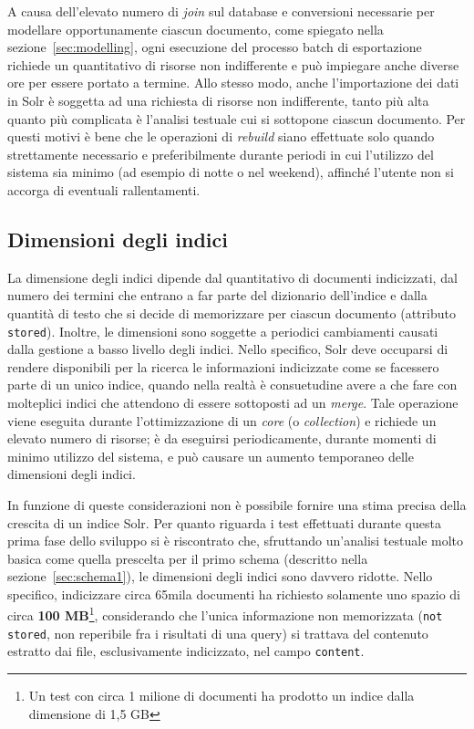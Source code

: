 \vspace{1em}

A causa dell’elevato numero di \textit{join} sul database e conversioni necessarie per modellare opportunamente ciascun documento, come spiegato nella sezione~\ref{sec:modelling}, ogni esecuzione del processo batch di esportazione richiede un quantitativo di risorse non indifferente e può impiegare anche diverse ore per essere portato a termine. Allo stesso modo, anche l’importazione dei dati in Solr è soggetta ad una richiesta di risorse non indifferente, tanto più alta quanto più complicata è l’analisi testuale cui si sottopone ciascun documento. Per questi motivi è bene che le operazioni di \textit{rebuild} siano effettuate solo quando strettamente necessario e preferibilmente durante periodi in cui l’utilizzo del sistema sia minimo (ad esempio di notte o nel weekend), affinché l’utente non si accorga di eventuali rallentamenti.



\subsection{Dimensioni degli indici}

La dimensione degli indici dipende dal quantitativo di documenti indicizzati, dal numero dei termini che entrano a far parte del dizionario dell'indice e dalla quantità di testo che si decide di memorizzare per ciascun documento (attributo \texttt{stored}). Inoltre, le dimensioni sono soggette a periodici cambiamenti causati dalla gestione a basso livello degli indici. Nello specifico, Solr deve occuparsi di rendere disponibili per la ricerca le informazioni indicizzate come se facessero parte di un unico indice, quando nella realtà è consuetudine avere a che fare con molteplici indici che attendono di essere sottoposti ad un \textit{merge}. Tale operazione viene eseguita durante l’ottimizzazione di un \textit{core} (o \textit{collection}) e richiede un elevato numero di risorse; è da eseguirsi periodicamente, durante momenti di minimo utilizzo del sistema, e può causare un aumento temporaneo delle dimensioni degli indici.

\vspace{1em}

In funzione di queste considerazioni non è possibile fornire una stima precisa della crescita di un indice Solr. Per quanto riguarda i test effettuati durante questa prima fase dello sviluppo si è riscontrato che, sfruttando un’analisi testuale molto basica come quella prescelta per il primo schema (descritto nella sezione~\ref{sec:schema1}), le dimensioni degli indici sono davvero ridotte. Nello specifico, indicizzare circa 65mila documenti ha richiesto solamente uno spazio di circa \textbf{100 MB}\footnote{Un test con circa 1 milione di documenti ha prodotto un indice dalla dimensione di 1,5 GB}, considerando che l’unica informazione non memorizzata (\texttt{not stored}, non reperibile fra i risultati di una query) si trattava del contenuto estratto dai file, esclusivamente indicizzato, nel campo \texttt{content}.

